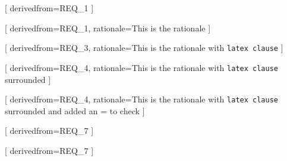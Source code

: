 


[
  derivedfrom=REQ\_1
]

[
  derivedfrom=REQ\_1,
  rationale=This is the rationale
]

[
  derivedfrom=REQ\_3,
  rationale=This is the rationale with \texttt{latex clause}
]

[
  derivedfrom=REQ\_4,
  rationale={This is the rationale with \texttt{latex clause} surrounded}
]

[
  derivedfrom=REQ\_4,
  rationale={This is the rationale with \texttt{latex clause} surrounded and added an = to check}
]

[
  derivedfrom=REQ\_7
]

[
  derivedfrom=REQ\_7
]
